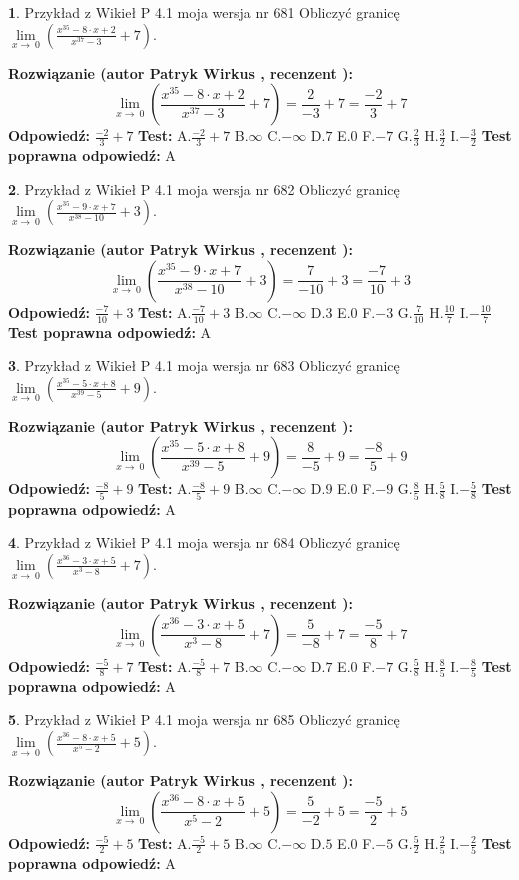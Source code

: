 \documentclass[12pt, a4paper]{article}
\theoremstyle{definition} %
\newtheorem{zad}{}
\newcommand{\zadStart}[1]{\begin{zad}#1\newline}
\newcommand{\zadStop}{\end{zad}}
\newcommand{\rozwStart}[2]{\noindent \textbf{Rozwiązanie (autor #1 , recenzent #2): }\newline}
\newcommand{\rozwStop}{\newline}
\newcommand{\odpStart}{\noindent \textbf{Odpowiedź:}\newline}
\newcommand{\odpStop}{\newline}
\newcommand{\testStart}{\noindent \textbf{Test:}\newline}
\newcommand{\testStop}{\newline}
\newcommand{\kluczStart}{\noindent \textbf{Test poprawna odpowiedź:}\newline}
\newcommand{\kluczStop}{\newline}
\begin{document}
\zadStart{Przykład z Wikieł P 4.1 moja wersja nr 681}
Obliczyć granicę $\lim\limits_{x\to\ 0}(\frac{x^{35}-8 \cdot x +2}{x^{37}-3}+7)$.
\zadStop
\rozwStart{Patryk Wirkus}{}
$$\lim\limits_{x\to\ 0}(\frac{x^{35}-8 \cdot x +2}{x^{37}-3}+7)=\frac{2}{-3}+7=\frac{-2}{3}+7$$
\rozwStop
\odpStart
$\frac{-2}{3}+7$
\odpStop
\testStart
A.$\frac{-2}{3}+7$
B.$\infty$
C.$-\infty$
D.$7$
E.$0$
F.$-7$
G.$\frac{2}{3}$
H.$\frac{3}{2}$
I.$-\frac{3}{2}$
\testStop
\kluczStart
A
\kluczStop



\zadStart{Przykład z Wikieł P 4.1 moja wersja nr 682}
Obliczyć granicę $\lim\limits_{x\to\ 0}(\frac{x^{35}-9 \cdot x +7}{x^{38}-10}+3)$.
\zadStop
\rozwStart{Patryk Wirkus}{}
$$\lim\limits_{x\to\ 0}(\frac{x^{35}-9 \cdot x +7}{x^{38}-10}+3)=\frac{7}{-10}+3=\frac{-7}{10}+3$$
\rozwStop
\odpStart
$\frac{-7}{10}+3$
\odpStop
\testStart
A.$\frac{-7}{10}+3$
B.$\infty$
C.$-\infty$
D.$3$
E.$0$
F.$-3$
G.$\frac{7}{10}$
H.$\frac{10}{7}$
I.$-\frac{10}{7}$
\testStop
\kluczStart
A
\kluczStop



\zadStart{Przykład z Wikieł P 4.1 moja wersja nr 683}
Obliczyć granicę $\lim\limits_{x\to\ 0}(\frac{x^{35}-5 \cdot x +8}{x^{39}-5}+9)$.
\zadStop
\rozwStart{Patryk Wirkus}{}
$$\lim\limits_{x\to\ 0}(\frac{x^{35}-5 \cdot x +8}{x^{39}-5}+9)=\frac{8}{-5}+9=\frac{-8}{5}+9$$
\rozwStop
\odpStart
$\frac{-8}{5}+9$
\odpStop
\testStart
A.$\frac{-8}{5}+9$
B.$\infty$
C.$-\infty$
D.$9$
E.$0$
F.$-9$
G.$\frac{8}{5}$
H.$\frac{5}{8}$
I.$-\frac{5}{8}$
\testStop
\kluczStart
A
\kluczStop



\zadStart{Przykład z Wikieł P 4.1 moja wersja nr 684}
Obliczyć granicę $\lim\limits_{x\to\ 0}(\frac{x^{36}-3 \cdot x +5}{x^{3}-8}+7)$.
\zadStop
\rozwStart{Patryk Wirkus}{}
$$\lim\limits_{x\to\ 0}(\frac{x^{36}-3 \cdot x +5}{x^{3}-8}+7)=\frac{5}{-8}+7=\frac{-5}{8}+7$$
\rozwStop
\odpStart
$\frac{-5}{8}+7$
\odpStop
\testStart
A.$\frac{-5}{8}+7$
B.$\infty$
C.$-\infty$
D.$7$
E.$0$
F.$-7$
G.$\frac{5}{8}$
H.$\frac{8}{5}$
I.$-\frac{8}{5}$
\testStop
\kluczStart
A
\kluczStop



\zadStart{Przykład z Wikieł P 4.1 moja wersja nr 685}
Obliczyć granicę $\lim\limits_{x\to\ 0}(\frac{x^{36}-8 \cdot x +5}{x^{5}-2}+5)$.
\zadStop
\rozwStart{Patryk Wirkus}{}
$$\lim\limits_{x\to\ 0}(\frac{x^{36}-8 \cdot x +5}{x^{5}-2}+5)=\frac{5}{-2}+5=\frac{-5}{2}+5$$
\rozwStop
\odpStart
$\frac{-5}{2}+5$
\odpStop
\testStart
A.$\frac{-5}{2}+5$
B.$\infty$
C.$-\infty$
D.$5$
E.$0$
F.$-5$
G.$\frac{5}{2}$
H.$\frac{2}{5}$
I.$-\frac{2}{5}$
\testStop
\kluczStart
A
\kluczStop
\end{document}
